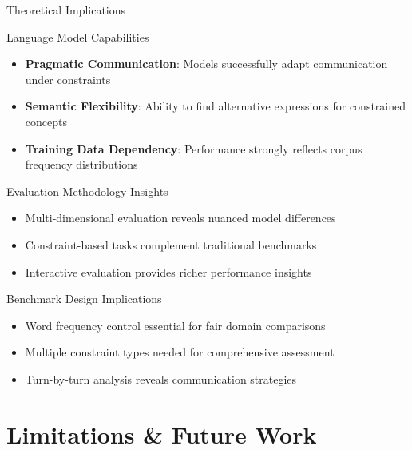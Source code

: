 \documentclass[aspectratio=169]{beamer}
\begin{document}
\begin{frame}{Theoretical Implications}
\begin{block}{Language Model Capabilities}
\begin{itemize}
    \item \textbf{Pragmatic Communication}: Models successfully adapt communication under constraints
    \item \textbf{Semantic Flexibility}: Ability to find alternative expressions for constrained concepts
    \item \textbf{Training Data Dependency}: Performance strongly reflects corpus frequency distributions
\end{itemize}
\end{block}

\begin{block}{Evaluation Methodology Insights}
\begin{itemize}
    \item Multi-dimensional evaluation reveals nuanced model differences
    \item Constraint-based tasks complement traditional benchmarks
    \item Interactive evaluation provides richer performance insights
\end{itemize}
\end{block}

\begin{block}{Benchmark Design Implications}
\begin{itemize}
    \item Word frequency control essential for fair domain comparisons
    \item Multiple constraint types needed for comprehensive assessment
    \item Turn-by-turn analysis reveals communication strategies
\end{itemize}
\end{block}
\end{frame}

\section{Limitations \& Future Work}
\end{document}
